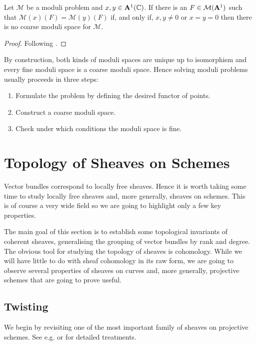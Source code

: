 \documentclass[12pt]{ociamthesis}  %
\begin{document}
\begin{lemma}\label{lem:no_coarse_condition}
  Let $\mathcal M$ be a moduli problem and
  $x,y\in \mathbf{A}^{1}_{}(\mathbb{C})$. If there is an
  $F\in\mathcal M(\mathbf{A}^{1}_{})$ such that
  $\mathcal M(x)(F) = \mathcal M(y)(F)$ if, and only if,
  $x,y\neq 0$ or $x=y=0$ then there is no coarse moduli space
  for $\mathcal M$.
  \begin{proof}
    Following \cite[Lemma 2.27]{hoskins2016}.
    \missingproof
  \end{proof}
\end{lemma}

By construction, both kinds of moduli spaces are unique up to
isomorphism and every fine moduli space is a coarse moduli
space. Hence solving moduli problems usually proceeds in
three steps:

\begin{enumerate}
  \item Formulate the problem by defining the desired functor of
        points.
  \item Construct a coarse moduli space.
  \item Check under which conditions the moduli space is fine.
\end{enumerate}

\section{Topology of Sheaves on Schemes}

Vector bundles correspond to locally free sheaves. Hence it is worth
taking some time to study locally free sheaves and, more generally,
sheaves on schemes. This is of course a very wide field
so we are going to highlight only a few key properties.

The main goal of this section is to establish some topological
invariants of coherent sheaves, generalising the grouping of
vector bundles by rank and degree. The obvious tool for studying
the topology of sheaves is cohomology. While we will have little
to do with sheaf cohomology in its raw form, we are going to
observe several properties of sheaves on curves and, more generally,
projective schemes that are going to prove useful.

\subsection{Twisting}

We begin by revisiting one of the most important family of sheaves
on projective schemes. See e.g. \cite{gortz2010} or
\cite{hartshorne1977} for detailed treatments.
\end{document}
